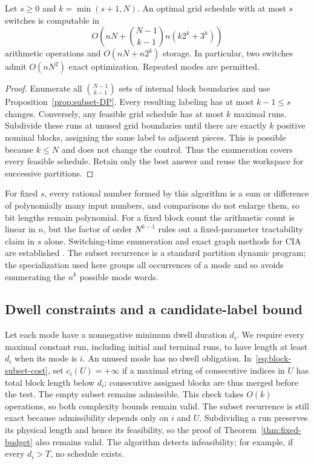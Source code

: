 \begin{theorem}\label{thm:fixed-budget}
Let $s\ge0$ and $k=\min(s+1,N)$. An optimal grid schedule with at most
$s$ switches is computable in
\begin{equation}\label{eq:fixed-budget-complexity}
 O\left(nN+\binom{N-1}{k-1}n(k2^k+3^k)\right)
\end{equation}
arithmetic operations and $O(nN+n2^k)$ storage. In particular, two switches
admit $O(nN^2)$ exact optimization. Repeated modes are permitted.
\end{theorem}
\begin{proof}
Enumerate all $\binom{N-1}{k-1}$ sets of internal block boundaries and use
Proposition~\ref{prop:subset-DP}. Every resulting labeling has at most
$k-1\le s$ changes. Conversely, any feasible grid schedule has at most $k$
maximal runs. Subdivide these runs at unused grid boundaries until there
are exactly $k$ positive nominal blocks, assigning the same label to adjacent
pieces. This is possible because $k\le N$ and does not change the control.
Thus the enumeration covers every feasible schedule. Retain only the best
answer and reuse the workspace for successive partitions.
\end{proof}

For fixed $s$, every rational number formed by this algorithm is a sum or
difference of polynomially many input numbers, and comparisons do not
enlarge them, so bit lengths remain polynomial. For a fixed block count the
arithmetic count is linear in $n$, but the factor of order $N^{k-1}$
rules out a fixed-parameter tractability claim in $s$ alone.
Switching-time enumeration and exact graph methods for CIA are established
\citep[Section~6.4.3]{zeile2021thesis}\citep{bestehorn2021shortest}.
The subset recurrence is a standard partition dynamic program; the
specialization used here groups all occurrences of a mode and so avoids
enumerating the $n^k$ possible mode words.

\subsection{Dwell constraints and a candidate-label bound}

Let each mode have a nonnegative minimum dwell duration $d_i$. We require
every maximal constant run, including initial and terminal runs, to have
length at least $d_i$ when its mode is $i$. An unused mode has no dwell
obligation. In~\eqref{eq:block-subset-cost}, set $c_i(U)=+\infty$ if a
maximal string of consecutive indices in $U$ has total block length below
$d_i$; consecutive assigned blocks are thus merged before the test.
The empty subset remains admissible. This check takes $O(k)$ operations,
so both complexity bounds remain valid. The subset recurrence is still
exact because admissibility depends only on $i$ and $U$. Subdividing a run
preserves its physical length and hence its feasibility, so the proof of
Theorem~\ref{thm:fixed-budget} also remains valid. The algorithm detects
infeasibility; for example, if every $d_i>T$, no schedule exists.

